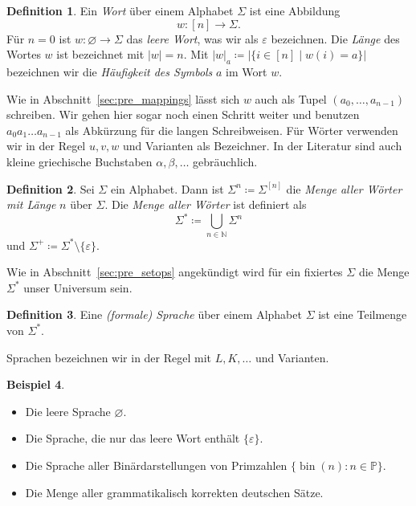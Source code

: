 \documentclass[11pt, a4paper]{article}
\theoremstyle{definition}
\newtheorem{definition}{Definition}[section]
\newtheorem{example}[definition]{Beispiel}
\theoremstyle{plain}
\numberwithin{equation}{section}
\DeclareMathOperator{\bin}{bin}
\let\emptyset\varnothing
\begin{document}
\begin{definition}
	Ein \textit{Wort} über einem Alphabet $\Sigma$ ist eine Abbildung
	$$
		w\colon [n] \to \Sigma.
	$$
	Für $n = 0$ ist $w\colon \emptyset \to \Sigma$ das \textit{leere Wort}, was wir als $\varepsilon$ bezeichnen.	Die \textit{Länge} des Wortes $w$ ist bezeichnet mit $|w| = n$. Mit $|w|_a \coloneqq \left| \{ i \in [n] \mid w(i) = a \} \right|$ bezeichnen wir die \textit{Häufigkeit des Symbols} $a$ im Wort $w$.
\end{definition}
Wie in Abschnitt~\ref{sec:pre_mappings} lässt sich $w$ auch als Tupel $(a_0, \ldots, a_{n-1})$ schreiben. Wir gehen hier sogar noch einen Schritt weiter und benutzen $a_0 a_1 \ldots a_{n-1}$ als Abkürzung für die langen Schreibweisen. Für Wörter verwenden wir in der Regel $u, v, w$ und Varianten als Bezeichner. In der Literatur sind auch kleine griechische Buchstaben $\alpha, \beta, \ldots$ gebräuchlich.
\begin{definition}
	Sei $\Sigma$ ein Alphabet. Dann ist $\Sigma^n \coloneqq \Sigma^{[n]}$ die \textit{Menge aller Wörter mit Länge} $n$ über $\Sigma$.
	Die \textit{Menge aller Wörter} ist definiert als
	$$
		\Sigma^\ast \coloneqq \bigcup_{n \in \mathbb{N}} \Sigma^n
	$$
	und $\Sigma^+ \coloneqq \Sigma^\ast \setminus \{ \varepsilon \}$.
\end{definition}
Wie in Abschnitt~\ref{sec:pre_setops} angekündigt wird für ein fixiertes $\Sigma$ die Menge $\Sigma^\ast$ unser Universum sein.
\begin{definition}
	Eine \textit{(formale) Sprache} über einem Alphabet $\Sigma$ ist eine Teilmenge von $\Sigma^\ast$.
\end{definition}
Sprachen bezeichnen wir in der Regel mit $L, K, \ldots$ und Varianten.
\begin{example}
	\
	\begin{itemize}
		\item Die leere Sprache $\emptyset$.
		\item Die Sprache, die nur das leere Wort enthält $\{\varepsilon\}$.
		\item Die Sprache aller Binärdarstellungen von Primzahlen $\{\bin(n) : n \in \mathbb{P}\}$.
		\item Die Menge aller grammatikalisch korrekten deutschen Sätze.
	\end{itemize}
\end{example}
\end{document}
